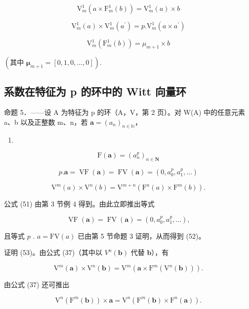 \[
\mathrm{V} _ {m} ^ {1} (a \times \mathrm{F} _ {m} ^ {1} (b)) = \mathrm{V} _ {m} ^ {1} (a) \times b\tag{49}
\]

\[
\mathrm{V} _ {m} ^ {1} (a) \times \mathrm{V} _ {m} ^ {1} (a ^ {\prime}) = p. \mathrm{V} _ {m} ^ {1} (a \times a ^ {\prime})\tag{50}
\]

\[
\mathrm{V} _ {m} ^ {1} (\mathrm{F} _ {m} ^ {1} (b)) = \mu_ {m + 1} \times b
\]

\((\text{其中 } \boldsymbol{\mu}_{m+1} = [0, 1, 0, ..., 0]).\)

\subsection{系数在特征为 p 的环中的 Witt 向量环}

命题 5．——设 A 为特征为 p 的环（A，V，第 2 页）。对 W(A) 中的任意元素 a、b 以及正整数 m、n，若 \(\boldsymbol{a} = (a_{n})_{n \in \mathbb{N}}\)，

\begin{enumerate}
\def\labelenumi{(\arabic{enumi})}
\setcounter{enumi}{50}
\tightlist
\item
\end{enumerate}

\[
\mathrm{F} (\boldsymbol {a}) = (a _ {n} ^ {p}) _ {n \in \mathbf {N}}\tag{52}
\]

\[
p. \boldsymbol {a} = \operatorname{VF} (\boldsymbol {a}) = \operatorname{FV} (\boldsymbol {a}) = (0, a _ {0} ^ {p}, a _ {1} ^ {p}, \dots)\tag{53}
\]

\[
\mathrm{V} ^ {m} (a) \times \mathrm{V} ^ {n} (b) = \mathrm{V} ^ {m + n} (\mathrm{F} ^ {n} (a) \times \mathrm{F} ^ {m} (b)).
\]

公式 (51) 由第 3 节例 4 得到。由此立即推出等式

\[
\operatorname{VF} (\boldsymbol {a}) = \operatorname{FV} (\boldsymbol {a}) = (0, a _ {0} ^ {p}, a _ {1} ^ {p}, \dots),
\]

且等式 \(p\) . \(a = \text{FV}(a)\) 已由第 5 节命题 3 证明，从而得到 (52)。

证明 (53)。由公式 (37)（其中以 \(V^n(\boldsymbol{b})\) 代替 \(\boldsymbol{b}\)），有

\[
\mathrm{V} ^ {m} (\boldsymbol {a}) \times \mathrm{V} ^ {n} (\boldsymbol {b}) = \mathrm{V} ^ {m} \left(\boldsymbol {a} \times \mathrm{F} ^ {m} \left(\mathrm{V} ^ {n} (\boldsymbol {b})\right)\right).\tag{54}
\]

由公式 (37) 还可推出

\[
\mathrm{V} ^ {n} \left(\mathrm{F} ^ {m} (\boldsymbol {b})\right) \times \boldsymbol {a} = \mathrm{V} ^ {n} \left(\mathrm{F} ^ {m} (\boldsymbol {b}) \times \mathrm{F} ^ {n} (\boldsymbol {a})\right).\tag{55}
\]

